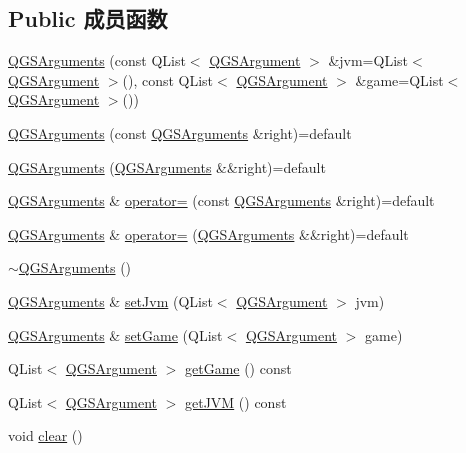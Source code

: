 \subsection*{Public 成员函数}
\begin{DoxyCompactItemize}
\item 
\mbox{\hyperlink{class_q_g_s_arguments_acd1cd222a227b3b63aa5ea58c32f9d1e}{Q\+G\+S\+Arguments}} (const Q\+List$<$ \mbox{\hyperlink{class_q_g_s_arguments_1_1_q_g_s_argument}{Q\+G\+S\+Argument}} $>$ \&jvm=Q\+List$<$ \mbox{\hyperlink{class_q_g_s_arguments_1_1_q_g_s_argument}{Q\+G\+S\+Argument}} $>$(), const Q\+List$<$ \mbox{\hyperlink{class_q_g_s_arguments_1_1_q_g_s_argument}{Q\+G\+S\+Argument}} $>$ \&game=Q\+List$<$ \mbox{\hyperlink{class_q_g_s_arguments_1_1_q_g_s_argument}{Q\+G\+S\+Argument}} $>$())
\item 
\mbox{\hyperlink{class_q_g_s_arguments_a3c7e17e049ccb57eb2ecc8039a89c213}{Q\+G\+S\+Arguments}} (const \mbox{\hyperlink{class_q_g_s_arguments}{Q\+G\+S\+Arguments}} \&right)=default
\item 
\mbox{\hyperlink{class_q_g_s_arguments_a9fa3d6ec242576d10dc97f980b5182d7}{Q\+G\+S\+Arguments}} (\mbox{\hyperlink{class_q_g_s_arguments}{Q\+G\+S\+Arguments}} \&\&right)=default
\item 
\mbox{\hyperlink{class_q_g_s_arguments}{Q\+G\+S\+Arguments}} \& \mbox{\hyperlink{class_q_g_s_arguments_a14e2926104051921e468d811cf59ab91}{operator=}} (const \mbox{\hyperlink{class_q_g_s_arguments}{Q\+G\+S\+Arguments}} \&right)=default
\item 
\mbox{\hyperlink{class_q_g_s_arguments}{Q\+G\+S\+Arguments}} \& \mbox{\hyperlink{class_q_g_s_arguments_a9156809a63704898b86de5844862b55a}{operator=}} (\mbox{\hyperlink{class_q_g_s_arguments}{Q\+G\+S\+Arguments}} \&\&right)=default
\item 
\mbox{\hyperlink{class_q_g_s_arguments_a08eaa9a74c86648762efba380adde9be}{$\sim$\+Q\+G\+S\+Arguments}} ()
\item 
\mbox{\hyperlink{class_q_g_s_arguments}{Q\+G\+S\+Arguments}} \& \mbox{\hyperlink{class_q_g_s_arguments_a00448cd21aedcfc36baf36674dfd02cf}{set\+Jvm}} (Q\+List$<$ \mbox{\hyperlink{class_q_g_s_arguments_1_1_q_g_s_argument}{Q\+G\+S\+Argument}} $>$ jvm)
\item 
\mbox{\hyperlink{class_q_g_s_arguments}{Q\+G\+S\+Arguments}} \& \mbox{\hyperlink{class_q_g_s_arguments_a55d8ebf48ca8923672b99270f1e90081}{set\+Game}} (Q\+List$<$ \mbox{\hyperlink{class_q_g_s_arguments_1_1_q_g_s_argument}{Q\+G\+S\+Argument}} $>$ game)
\item 
Q\+List$<$ \mbox{\hyperlink{class_q_g_s_arguments_1_1_q_g_s_argument}{Q\+G\+S\+Argument}} $>$ \mbox{\hyperlink{class_q_g_s_arguments_a8f75e12b64f3496591fcdc5a516e325a}{get\+Game}} () const
\item 
Q\+List$<$ \mbox{\hyperlink{class_q_g_s_arguments_1_1_q_g_s_argument}{Q\+G\+S\+Argument}} $>$ \mbox{\hyperlink{class_q_g_s_arguments_aac666f076abb596f0a0582d9c45f2af6}{get\+J\+VM}} () const
\item 
void \mbox{\hyperlink{class_q_g_s_arguments_a0dbdf31e77119bbb29b280e182ca1fb7}{clear}} ()
\end{DoxyCompactItemize}



